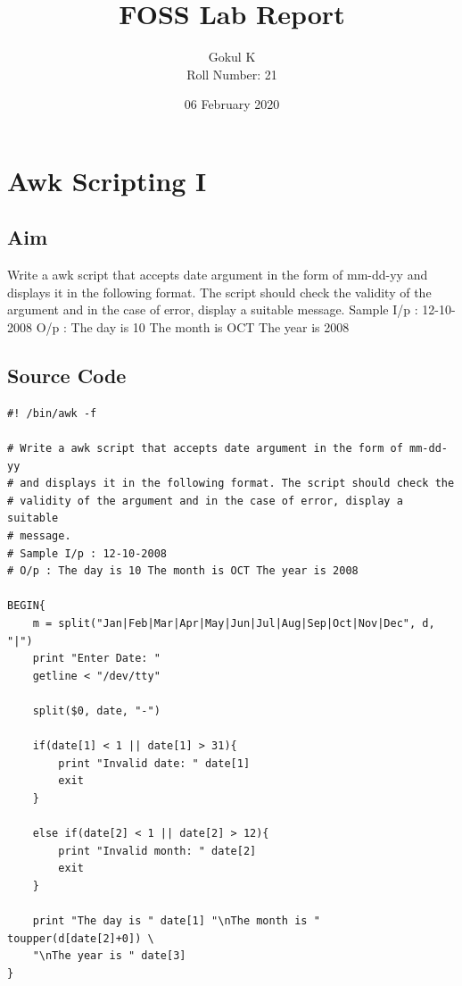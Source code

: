 \documentclass{article}
\begin{document}
\title{FOSS Lab Report}
\author{Gokul K\\[2\baselineskip]
Roll Number: 21\\[2\baselineskip]}
\date{06 February 2020}

\maketitle

\setcounter{section}{15}
\section{Awk Scripting I}
\subsection{Aim}
Write a awk script that accepts date argument in the form of mm-dd-yy 
and displays it in the following format. The script should check the 
validity of the argument and in the case of error, display a suitable 
message.\newline
Sample I/p : 12-10-2008\newline
O/p : The day is 10 The month is OCT The year is 2008\newline

\subsection{Source Code}
\begin{verbatim}
#! /bin/awk -f

# Write a awk script that accepts date argument in the form of mm-dd-yy 
# and displays it in the following format. The script should check the 
# validity of the argument and in the case of error, display a suitable 
# message.
# Sample I/p : 12-10-2008
# O/p : The day is 10 The month is OCT The year is 2008

BEGIN{
    m = split("Jan|Feb|Mar|Apr|May|Jun|Jul|Aug|Sep|Oct|Nov|Dec", d, "|")
    print "Enter Date: "
    getline < "/dev/tty"

    split($0, date, "-")
    
    if(date[1] < 1 || date[1] > 31){
        print "Invalid date: " date[1]
        exit
    }

    else if(date[2] < 1 || date[2] > 12){
        print "Invalid month: " date[2]
        exit
    }

    print "The day is " date[1] "\nThe month is " toupper(d[date[2]+0]) \
    "\nThe year is " date[3]
}
\end{verbatim}
\end{document}
